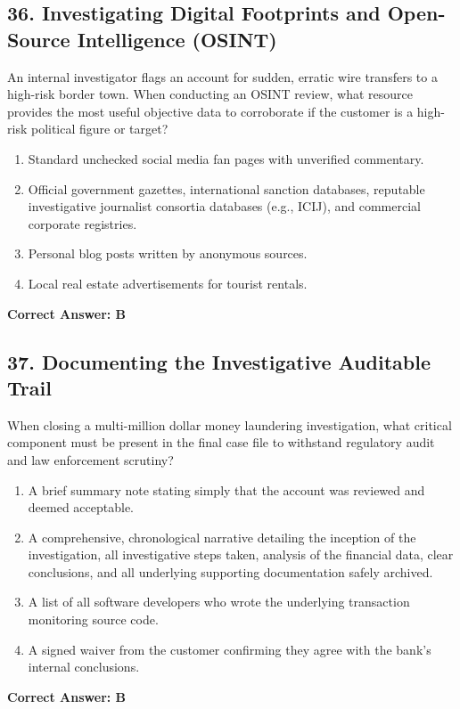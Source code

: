 \documentclass[11pt,a4paper]{article}
\begin{document}
	\subsection{36. Investigating Digital Footprints and Open-Source Intelligence (OSINT)}
	An internal investigator flags an account for sudden, erratic wire transfers to a high-risk border town. When conducting an OSINT review, what resource provides the most useful objective data to corroborate if the customer is a high-risk political figure or target?
	\begin{enumerate}[label=\Alph*.]
		\item Standard unchecked social media fan pages with unverified commentary.
		\item Official government gazettes, international sanction databases, reputable investigative journalist consortia databases (e.g., ICIJ), and commercial corporate registries.
		\item Personal blog posts written by anonymous sources.
		\item Local real estate advertisements for tourist rentals.
	\end{enumerate}
	\textbf{Correct Answer: B}
	
	\subsection{37. Documenting the Investigative Auditable Trail}
	When closing a multi-million dollar money laundering investigation, what critical component must be present in the final case file to withstand regulatory audit and law enforcement scrutiny?
	\begin{enumerate}[label=\Alph*.]
		\item A brief summary note stating simply that the account was reviewed and deemed acceptable.
		\item A comprehensive, chronological narrative detailing the inception of the investigation, all investigative steps taken, analysis of the financial data, clear conclusions, and all underlying supporting documentation safely archived.
		\item A list of all software developers who wrote the underlying transaction monitoring source code.
		\item A signed waiver from the customer confirming they agree with the bank's internal conclusions.
	\end{enumerate}
	\textbf{Correct Answer: B}
	
\end{document}
